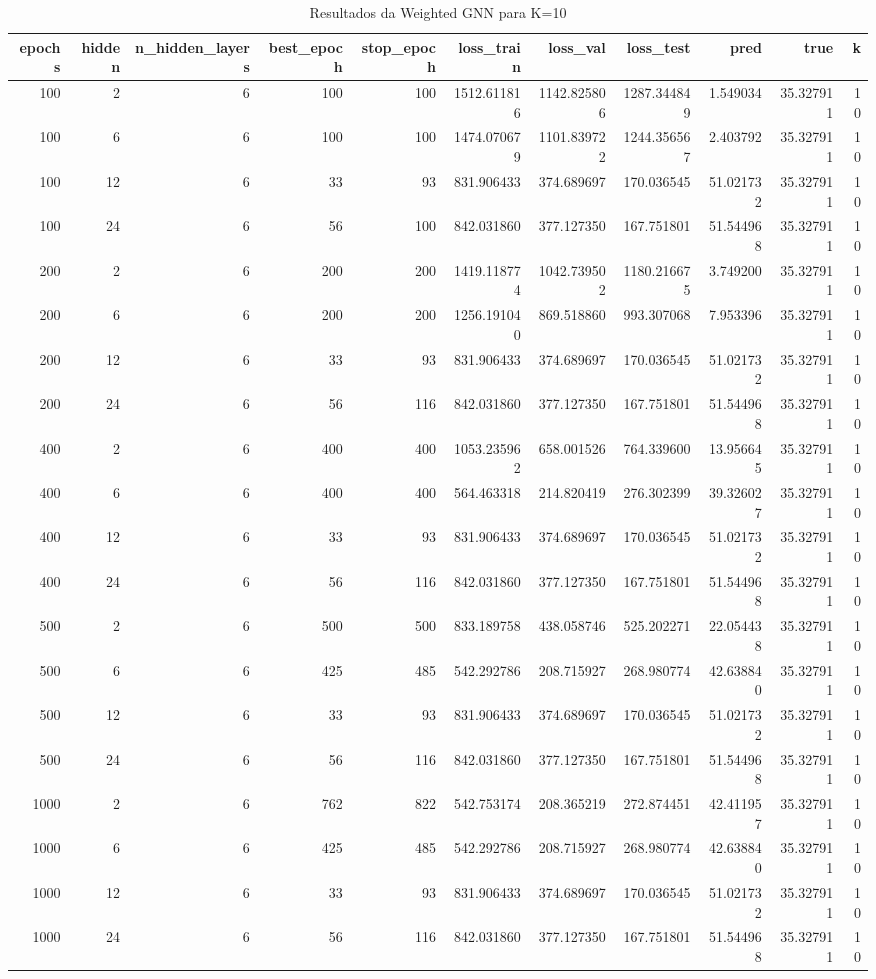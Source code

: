 \begin{table}
\caption{Resultados da Weighted GNN para K=10}
\label{tab:weighted_gnn_results_k10}
\begin{tabular}{rrrrrrrrrrr}
\toprule
epochs & hidden & n\_hidden\_layers & best\_epoch & stop\_epoch & loss\_train & loss\_val & loss\_test & pred & true & k \\
\midrule
100 & 2 & 6 & 100 & 100 & 1512.611816 & 1142.825806 & 1287.344849 & 1.549034 & 35.327911 & 10 \\
100 & 6 & 6 & 100 & 100 & 1474.070679 & 1101.839722 & 1244.356567 & 2.403792 & 35.327911 & 10 \\
100 & 12 & 6 & 33 & 93 & 831.906433 & 374.689697 & 170.036545 & 51.021732 & 35.327911 & 10 \\
100 & 24 & 6 & 56 & 100 & 842.031860 & 377.127350 & 167.751801 & 51.544968 & 35.327911 & 10 \\
200 & 2 & 6 & 200 & 200 & 1419.118774 & 1042.739502 & 1180.216675 & 3.749200 & 35.327911 & 10 \\
200 & 6 & 6 & 200 & 200 & 1256.191040 & 869.518860 & 993.307068 & 7.953396 & 35.327911 & 10 \\
200 & 12 & 6 & 33 & 93 & 831.906433 & 374.689697 & 170.036545 & 51.021732 & 35.327911 & 10 \\
200 & 24 & 6 & 56 & 116 & 842.031860 & 377.127350 & 167.751801 & 51.544968 & 35.327911 & 10 \\
400 & 2 & 6 & 400 & 400 & 1053.235962 & 658.001526 & 764.339600 & 13.956645 & 35.327911 & 10 \\
400 & 6 & 6 & 400 & 400 & 564.463318 & 214.820419 & 276.302399 & 39.326027 & 35.327911 & 10 \\
400 & 12 & 6 & 33 & 93 & 831.906433 & 374.689697 & 170.036545 & 51.021732 & 35.327911 & 10 \\
400 & 24 & 6 & 56 & 116 & 842.031860 & 377.127350 & 167.751801 & 51.544968 & 35.327911 & 10 \\
500 & 2 & 6 & 500 & 500 & 833.189758 & 438.058746 & 525.202271 & 22.054438 & 35.327911 & 10 \\
500 & 6 & 6 & 425 & 485 & 542.292786 & 208.715927 & 268.980774 & 42.638840 & 35.327911 & 10 \\
500 & 12 & 6 & 33 & 93 & 831.906433 & 374.689697 & 170.036545 & 51.021732 & 35.327911 & 10 \\
500 & 24 & 6 & 56 & 116 & 842.031860 & 377.127350 & 167.751801 & 51.544968 & 35.327911 & 10 \\
1000 & 2 & 6 & 762 & 822 & 542.753174 & 208.365219 & 272.874451 & 42.411957 & 35.327911 & 10 \\
1000 & 6 & 6 & 425 & 485 & 542.292786 & 208.715927 & 268.980774 & 42.638840 & 35.327911 & 10 \\
1000 & 12 & 6 & 33 & 93 & 831.906433 & 374.689697 & 170.036545 & 51.021732 & 35.327911 & 10 \\
1000 & 24 & 6 & 56 & 116 & 842.031860 & 377.127350 & 167.751801 & 51.544968 & 35.327911 & 10 \\
\bottomrule
\end{tabular}
\end{table}
